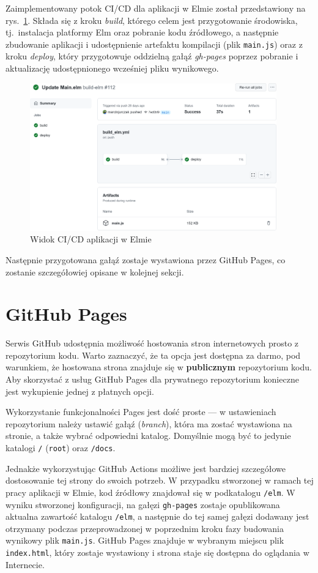 \documentclass[twoside,a4paper]{report}
\begin{document}
Zaimplementowany potok CI/CD dla aplikacji w Elmie został przedstawiony na rys.~\ref{fig:elm_yml}.
Składa się z kroku \textit{build}, którego celem jest przygotowanie środowiska, tj.~instalacja platformy Elm oraz pobranie kodu źródłowego, a następnie zbudowanie aplikacji i udostępnienie artefaktu kompilacji (plik \texttt{main.js}) oraz z kroku \textit{deploy}, który przygotowuje oddzielną gałąź \textit{gh-pages} poprzez pobranie i aktualizację udostępnionego wcześniej pliku wynikowego.
\begin{figure}[H]
    \centering
    \includegraphics[width=0.95\textwidth]{img/elm_yml.png}
    \caption{Widok CI/CD aplikacji w Elmie}\label{fig:elm_yml}
\end{figure}

Następnie przygotowana gałąź zostaje wystawiona przez GitHub Pages, co zostanie szczegółowiej opisane w kolejnej sekcji.

\section{GitHub Pages}
Serwis GitHub udostępnia możliwość hostowania stron internetowych prosto z repozytorium kodu.
Warto zaznaczyć, że ta opcja jest dostępna za darmo, pod warunkiem, że hostowana strona znajduje się w \textbf{publicznym} repozytorium kodu.
Aby skorzystać z usług GitHub Pages dla prywatnego repozytorium konieczne jest wykupienie jednej z płatnych opcji.

Wykorzystanie funkcjonalności Pages jest dość proste --- w ustawieniach repozytorium należy ustawić gałąź (\textit{branch}), która ma zostać wystawiona na stronie, a także wybrać odpowiedni katalog.
Domyślnie mogą być to jedynie katalogi \texttt{/} (\texttt{root}) oraz \texttt{/docs}.

Jednakże wykorzystując GitHub Actions możliwe jest bardziej szczegółowe dostosowanie tej strony do swoich potrzeb.
W przypadku stworzonej w ramach tej pracy aplikacji w Elmie, kod źródłowy znajdował się w podkatalogu \texttt{/elm}.
W wyniku stworzonej konfiguracji, na gałęzi \texttt{gh-pages} zostaje opublikowana aktualna zawartość katalogu \texttt{/elm}, a następnie do tej samej gałęzi dodawany jest otrzymany podczas przeprowadzonej w poprzednim kroku fazy budowania wynikowy plik \texttt{main.js}.
GitHub Pages znajduje w wybranym miejscu plik \texttt{index.html}, który zostaje wystawiony i strona staje się dostępna do oglądania w Internecie.
\end{document}
